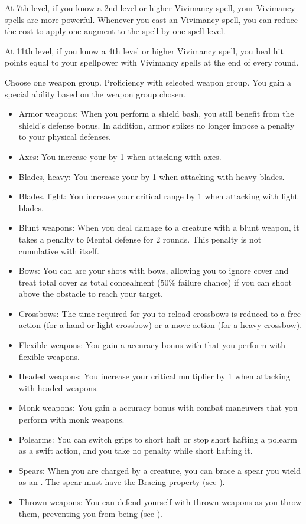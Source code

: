     At 7th level, if you know a 2nd level or higher Vivimancy spell, your Vivimancy spells are more powerful.
    Whenever you cast an Vivimancy spell, you can reduce the cost to apply one augment to the spell by one spell level.

    At 11th level, if you know a 4th level or higher Vivimancy spell, you heal hit points equal to your spellpower with Vivimancy spells at the end of every round.

    Choose one weapon group.
    \featpre Proficiency with selected weapon group.
    \featben You gain a special ability based on the weapon group chosen.
    \begin{itemize}
        \item Armor weapons: When you perform a shield bash, you still benefit from the shield's defense bonus.
            In addition, armor spikes no longer impose a penalty to your physical defenses.
        \item Axes: You increase your  by 1 when attacking with axes.
        \item Blades, heavy: You increase your  by 1 when attacking with heavy blades.
        \item Blades, light: You increase your critical range by 1 when attacking with light blades.
        \item Blunt weapons: When you deal damage to a creature with a blunt weapon, it takes a  penalty to Mental defense for 2 rounds.
            This penalty is not cumulative with itself.
        \item Bows: You can arc your shots with bows, allowing you to ignore cover and treat total cover as total concealment (50\% failure chance) if you can shoot above the obstacle to reach your target.
        \item Crossbows: The time required for you to reload crossbows is reduced to a free action (for a hand or light crossbow) or a move action (for a heavy crossbow).
        \item Flexible weapons: You gain a  accuracy bonus with  that you perform with flexible weapons.
        \item Headed weapons: You increase your critical multiplier by 1 when attacking with headed weapons.
        \item Monk weapons: You gain a  accuracy bonus with combat maneuvers that you perform with monk weapons.
        \item Polearms: You can switch grips to short haft or stop short hafting a polearm as a swift action, and you take no penalty while short hafting it.
        \item Spears: When you are charged by a creature, you can brace a spear you wield as an . The spear must have the Bracing property (see ).
        \item Thrown weapons: You can defend yourself with thrown weapons as you throw them, preventing you from being  (see ).
    \end{itemize}

